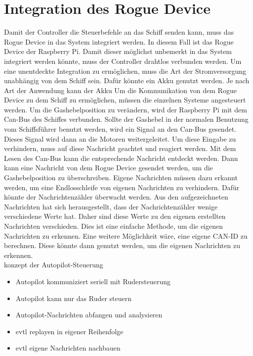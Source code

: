 \section{Integration des Rogue Device}
Damit der Controller die Steuerbefehle an das Schiff senden kann, muss das Rogue Device in das System integriert werden.
In diesem Fall ist das Rogue Device der Raspberry Pi. Damit dieser möglichst unbemerkt in das System integriert werden könnte,
muss der Controller drahtlos verbunden werden. Um eine unentdeckte Integration zu ermöglichen, muss die Art der Stromversorgung
unabhängig von dem Schiff sein. Dafür könnte ein Akku genutzt werden. Je nach Art der Anwendung kann der Akku 
Um die Kommunikation von dem Rogue Device zu dem Schiff zu ermöglichen, müssen
die einzelnen Systeme angesteuert werden. Um die Gashebelposition zu verändern, wird der Raspberry Pi mit dem Can-Bus des Schiffes
verbunden. 
Sollte der Gashebel in der normalen Benutzung vom Schiffsführer benutzt werden, wird ein Signal an den Can-Bus gesendet. 
Dieses Signal wird dann an die Motoren weitergeleitet.
Um diese Eingabe zu verhindern, muss auf diese Nachricht geachtet und reagiert werden. Mit dem Lesen des Can-Bus kann die 
entsprechende Nachricht entdeckt werden. Dann kann eine Nachricht von dem Rogue Device gesendet werden, um die Gashebelposition
zu überschreiben. Eigene Nachrichten müssen dazu erkannt werden, um eine Endlosschleife von eigenen Nachrichten zu verhindern. Dafür könnte
der Nachrichtenzähler überwacht werden. Aus den aufgezeichneten Nachrichten hat sich herausgestellt, dass der 
Nachrichtenzähler wenige verschiedene Werte hat. Daher sind diese Werte zu den eigenen erstellten Nachrichten 
verschieden. Dies ist eine einfache Methode, um die eigenen Nachrichten zu erkennen. Eine weitere Möglichkeit wäre,
eine eigene CAN-ID zu berechnen. Diese könnte dann genutzt werden, um die eigenen Nachrichten zu erkennen.
\\
konzept der Autopilot-Steuerung
\begin{itemize}
    \item Autopilot kommuniziert seriell mit Rudersteuerung
    \item Autopilot kann nur das Ruder steuern
    \item Autopilot-Nachrichten abfangen und analysieren
    \item evtl replayen in eigener Reihenfolge
    \item evtl eigene Nachrichten nachbauen
\end{itemize}


